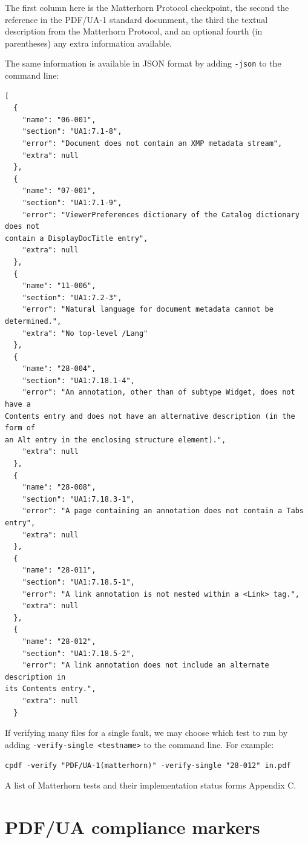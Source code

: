 \documentclass{book}
\begin{document}
\noindent The first column here is the Matterhorn Protocol checkpoint, the second the reference in the PDF/UA-1 standard docunment, the third the textual description from the Matterhorn Protocol, and an optional fourth (in parentheses) any extra information available.

The same information is available in JSON format by adding \texttt{-json} to the command line:

{\small\begin{verbatim}
[
  {
    "name": "06-001",
    "section": "UA1:7.1-8",
    "error": "Document does not contain an XMP metadata stream",
    "extra": null
  },
  {
    "name": "07-001",
    "section": "UA1:7.1-9",
    "error": "ViewerPreferences dictionary of the Catalog dictionary does not
contain a DisplayDocTitle entry",
    "extra": null
  },
  {
    "name": "11-006",
    "section": "UA1:7.2-3",
    "error": "Natural language for document metadata cannot be determined.",
    "extra": "No top-level /Lang"
  },
  {
    "name": "28-004",
    "section": "UA1:7.18.1-4",
    "error": "An annotation, other than of subtype Widget, does not have a
Contents entry and does not have an alternative description (in the form of
an Alt entry in the enclosing structure element).",
    "extra": null
  },
  {
    "name": "28-008",
    "section": "UA1:7.18.3-1",
    "error": "A page containing an annotation does not contain a Tabs entry",
    "extra": null
  },
  {
    "name": "28-011",
    "section": "UA1:7.18.5-1",
    "error": "A link annotation is not nested within a <Link> tag.",
    "extra": null
  },
  {
    "name": "28-012",
    "section": "UA1:7.18.5-2",
    "error": "A link annotation does not include an alternate description in
its Contents entry.",
    "extra": null
  }\end{verbatim}}

\noindent If verifying many files for a single fault, we may choose which test to run by adding \texttt{-verify-single <testname>} to the command line. For example:


  \begin{framed}
    \noindent\small\verb!cpdf -verify "PDF/UA-1(matterhorn)" -verify-single "28-012" in.pdf!
  \end{framed}

\noindent A list of Matterhorn tests and their implementation status forms Appendix C.

\section{PDF/UA compliance markers}
\end{document}
